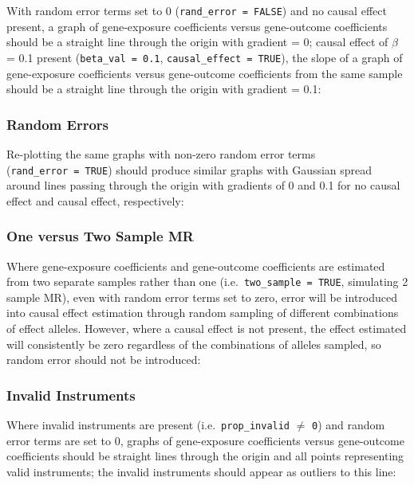 \documentclass[
]{article}
\begin{document}
\newpage

With random error terms set to 0 (\texttt{rand\_error\ =\ FALSE}) and no causal effect present, a graph of gene-exposure coefficients versus gene-outcome coefficients should be a straight line through the origin with gradient = 0; causal effect of \(\beta\) = 0.1 present (\texttt{beta\_val\ =\ 0.1}, \texttt{causal\_effect\ =\ TRUE}), the slope of a graph of gene-exposure coefficients versus gene-outcome coefficients from the same sample should be a straight line through the origin with gradient = 0.1:

\newpage

\subsubsection{Random Errors}\label{random-errors}

\leavevmode\newline Re-plotting the same graphs with non-zero random error terms (\texttt{rand\_error\ =\ TRUE}) should produce similar graphs with Gaussian spread around lines passing through the origin with gradients of 0 and 0.1 for no causal effect and causal effect, respectively:

\newpage

\subsubsection{One versus Two Sample MR}\label{one-versus-two-sample-mr}

\leavevmode\newline Where gene-exposure coefficients and gene-outcome coefficients are estimated from two separate samples rather than one (i.e.~\texttt{two\_sample\ =\ TRUE}, simulating 2 sample MR), even with random error terms set to zero, error will be introduced into causal effect estimation through random sampling of different combinations of effect alleles. However, where a causal effect is not present, the effect estimated will consistently be zero regardless of the combinations of alleles sampled, so random error should not be introduced:

\newpage

\subsubsection{Invalid Instruments}\label{invalid-instruments}

\leavevmode\newline Where invalid instruments are present (i.e.~\texttt{prop\_invalid} \(\ne\) \texttt{0}) and random error terms are set to 0, graphs of gene-exposure coefficients versus gene-outcome coefficients should be straight lines through the origin and all points representing valid instruments; the invalid instruments should appear as outliers to this line:
\end{document}
